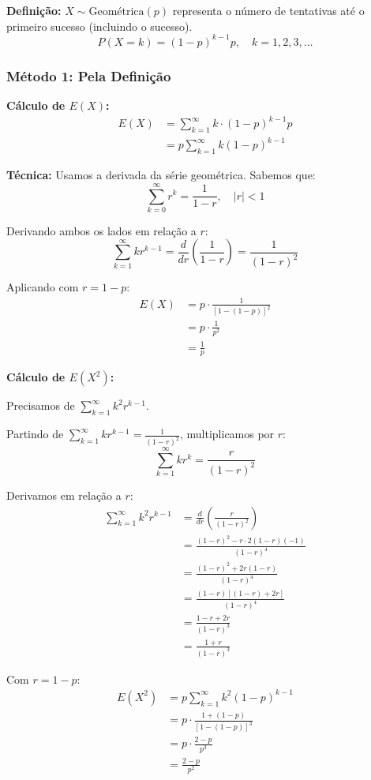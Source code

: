\documentclass[12pt,a4paper]{article}
\theoremstyle{plain}
\theoremstyle{definition}
\theoremstyle{remark}
\begin{document}
\textbf{Definição:} \(X \sim \text{Geométrica}(p)\) representa o número de tentativas até o primeiro sucesso (incluindo o sucesso).
\[
P(X = k) = (1-p)^{k-1} p, \quad k = 1, 2, 3, \ldots
\]

\subsubsection{Método 1: Pela Definição}

\textbf{Cálculo de \(E(X)\):}
\begin{align}
E(X) &= \sum_{k=1}^{\infty} k \cdot (1-p)^{k-1} p \\
&= p \sum_{k=1}^{\infty} k(1-p)^{k-1}
\end{align}

\textbf{Técnica:} Usamos a derivada da série geométrica. Sabemos que:
\[
\sum_{k=0}^{\infty} r^k = \frac{1}{1-r}, \quad |r| < 1
\]

Derivando ambos os lados em relação a \(r\):
\[
\sum_{k=1}^{\infty} kr^{k-1} = \frac{d}{dr}\left(\frac{1}{1-r}\right) = \frac{1}{(1-r)^2}
\]

Aplicando com \(r = 1-p\):
\begin{align}
E(X) &= p \cdot \frac{1}{[1-(1-p)]^2} \\
&= p \cdot \frac{1}{p^2} \\
&= \frac{1}{p}
\end{align}

\textbf{Cálculo de \(E(X^2)\):}

Precisamos de \(\sum_{k=1}^{\infty} k^2 r^{k-1}\). 

Partindo de \(\sum_{k=1}^{\infty} kr^{k-1} = \frac{1}{(1-r)^2}\), multiplicamos por \(r\):
\[
\sum_{k=1}^{\infty} kr^k = \frac{r}{(1-r)^2}
\]

Derivamos em relação a \(r\):
\begin{align}
\sum_{k=1}^{\infty} k^2r^{k-1} &= \frac{d}{dr}\left(\frac{r}{(1-r)^2}\right) \\
&= \frac{(1-r)^2 - r \cdot 2(1-r)(-1)}{(1-r)^4} \\
&= \frac{(1-r)^2 + 2r(1-r)}{(1-r)^4} \\
&= \frac{(1-r)[(1-r) + 2r]}{(1-r)^4} \\
&= \frac{1-r + 2r}{(1-r)^3} \\
&= \frac{1+r}{(1-r)^3}
\end{align}

Com \(r = 1-p\):
\begin{align}
E(X^2) &= p \sum_{k=1}^{\infty} k^2(1-p)^{k-1} \\
&= p \cdot \frac{1+(1-p)}{[1-(1-p)]^3} \\
&= p \cdot \frac{2-p}{p^3} \\
&= \frac{2-p}{p^2}
\end{align}
\end{document}
